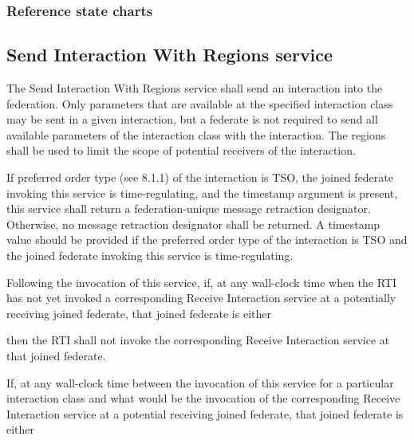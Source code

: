 \begin{compactstdpage}


    \subsubsection{Reference state charts}


    \subsection{Send Interaction With Regions service}

    The Send Interaction With Regions service shall send an interaction into the federation. Only parameters that are available at the specified interaction class may be sent in a given interaction, but a federate is not required to send all available parameters of the interaction class with the interaction. The regions shall be used to limit the scope of potential receivers of the interaction.

    If preferred order type (see 8.1.1) of the interaction is TSO, the joined federate invoking this service is time-regulating, and the timestamp argument is present, this service shall return a federation-unique message retraction designator. Otherwise, no message retraction designator shall be returned. A timestamp value should be provided if the preferred order type of the interaction is TSO and the joined federate invoking this service is time-regulating.

    Following the invocation of this service, if, at any wall-clock time when the RTI has not yet invoked a corresponding Receive Interaction \rtiinitiated{} service at a potentially receiving joined federate, that joined federate is either

    then the RTI shall not invoke the corresponding Receive Interaction \rtiinitiated{} service at that joined federate.

    If, at any wall-clock time between the invocation of this service for a particular interaction class and what would be the invocation of the corresponding Receive Interaction \rtiinitiated{} service at a potential receiving joined federate, that joined federate is either


\end{compactstdpage}
